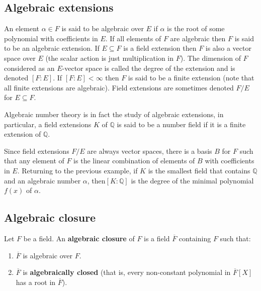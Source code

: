 \subsection{Algebraic extensions}

\begin{definition}An element $\alpha\in F$ is said to be algebraic over $E$ if
$\alpha$ is the root of some polynomial with coefficients in $E$. If all
elements of $F$ are algebraic then $F$ is said to be an algebraic extension. If
$E\subseteq F$ is a field extension then $F$ is also a vector space over $E$
(the scalar action is just multiplication in $F$). The dimension of $F$
considered as an $E$-vector space is called the degree of the extension and is
denoted $[F:E]$. If $[F:E]<\infty$ then $F$ is said to be a finite extension
(note that all finite extensions are algebraic). Field extensions are sometimes
denoted $F/E$ for $E\subseteq F$.
\end{definition}

Algebraic number theory is in fact the study of algebraic extensions, in
particular, a field extensions $K$ of $\mathbb{Q}$ is said to be a number field
if it is a finite extension of $\mathbb{Q}$.

Since field extensions $F/E$ are always vector spaces, there is a basis $B$ for
$F$ such that any element of $F$ is the linear combination of elements of $B$
with coefficients in $E$. Returning to the previous example, if $K$ is the
smallest field that contains $\mathbb{Q}$ and an algebraic number $\alpha$,
then$[K:\mathbb{Q}]$ is the degree of the minimal polynomial $f(x)$ of $\alpha$.



\subsection{Algebraic closure}

\begin{definition} 
Let $F$ be a field. An \textbf{algebraic closure} of $F$ is a field
$\overline{F}$ containing $F$ such that:
\begin{enumerate}[\textbf{AC} 1]
\item $\overline{F} $ is algebraic over $F$.
\item $\overline{F}$ is \textbf{algebraically closed} (that is, every
non-constant polynomial in $\overline{F}[X]$ has a root in $\overline{F}$).
\end{enumerate}
\end{definition} 


